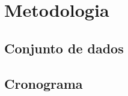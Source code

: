 \chapter{Metodologia}
\label{cap:metodologia}


\section{Conjunto de dados}



\section{Cronograma}
















